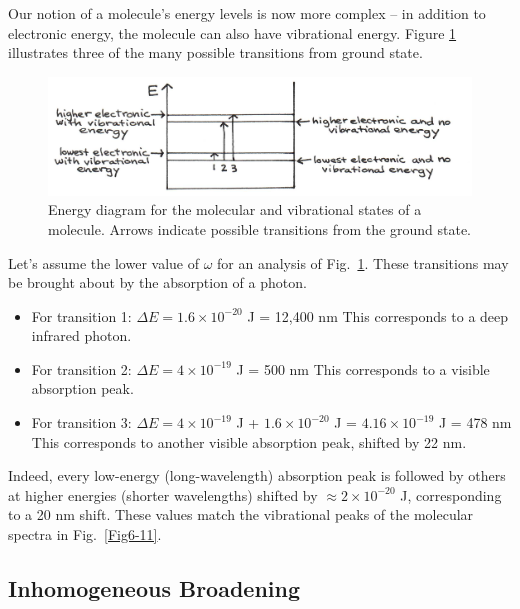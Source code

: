 Our notion of a molecule’s energy levels is now more complex -- in addition to electronic energy, the molecule can also have vibrational energy.  Figure \ref{Fig6-12} illustrates three of the many possible transitions from ground state.  
\begin{figure}[h]
	\centering
	\includegraphics[width=\textwidth]{./figures/Topic6/Fig6-12.jpg}
	\caption{Energy diagram for the molecular and vibrational states of a molecule.  Arrows indicate possible transitions from the ground state.}
	\label{Fig6-12}
\end{figure}
Let's assume the lower value of $\omega$ for an analysis of Fig.~\ref{Fig6-12}. These transitions may be brought about by the absorption of a photon.
\begin{itemize}
\item For transition 1:
	\subitem $\Delta E = 1.6\times10^{-20}$ J = 12,400 nm
	\subitem This corresponds to a deep infrared photon.
\item For transition 2:
	\subitem $\Delta E = 4\times 10^{-19}$ J = 500 nm	
	\subitem This corresponds to a visible absorption peak.
\item For transition 3:
	\subitem $\Delta E = 4\times 10^{-19}$ J + $1.6\times10^{-20}$ J = $4.16\times10^{-19}$ J = 478 nm
	\subitem This corresponds to another visible absorption peak, shifted by 22 nm.
\end{itemize}

Indeed, every low-energy (long-wavelength) absorption peak is followed by others at higher energies (shorter wavelengths) shifted by $\approx 2\times10^{-20}$ J, corresponding to a 20 nm shift.  These values match the vibrational peaks of the molecular spectra in Fig.~\ref{Fig6-11}.

\subsection{Inhomogeneous Broadening}

